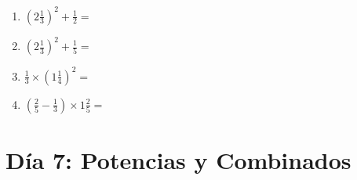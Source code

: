 \documentclass[12pt]{article}
\begin{document}
\begin{enumerate}
\item \large $ \left( 2 \frac{1}{3} \right)^2 + \frac{1}{2} = $ \vspace{1.6cm}
\item \large $ \left( 2 \frac{1}{3} \right)^2 + \frac{1}{5} = $ \vspace{1.6cm}
\item \large $ \frac{1}{3} \times \left( 1 \frac{1}{4} \right)^2 = $ \vspace{1.6cm}
\item \large $ \left( \frac{2}{5} - \frac{1}{3} \right) \times 1 \frac{2}{5} = $ \vspace{1.6cm}
\end{enumerate}\newpage
\section*{Día 7: Potencias y Combinados}
\end{document}
